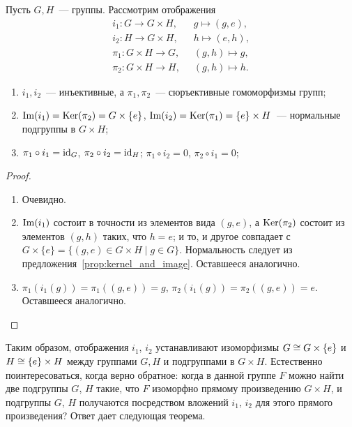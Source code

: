 \begin{proposition}\label{prop:direct_product_properties}
Пусть $G,H$~--- группы.
Рассмотрим отображения
\begin{align*}
i_1\colon G\to G\times H,&\;\; g\mapsto (g,e),\\
i_2\colon H\to G\times H,&\;\; h\mapsto (e,h),\\
\pi_1\colon G\times H\to G,&\;\; (g,h)\mapsto g,\\
\pi_2\colon G\times H\to H,&\;\; (g,h)\mapsto h.
\end{align*}
\begin{enumerate}
\item $i_1,i_2$~--- инъективные, а $\pi_1,\pi_2$~--- сюръективные
  гомоморфизмы групп;
\item\label{item:direct_product_2}
  $\operatorname{Im}(i_1)=\operatorname{Ker}(\pi_2)=G\times\{e\}$,
  $\operatorname{Im}(i_2)=\operatorname{Ker}(\pi_1)=\{e\}\times H$~--- нормальные подгруппы в
  $G\times H$;
\item $\pi_1\circ i_1 = \operatorname{id}_G$, $\pi_2\circ i_2 = \operatorname{id}_H$;
  $\pi_1\circ i_2 = 0$, $\pi_2\circ i_1 = 0$;
\end{enumerate}
\end{proposition}
\begin{proof}
\begin{enumerate}
\item Очевидно.
\item $\operatorname{Im}(i_1)$ состоит в точности из элементов вида $(g,e)$, а
  $\operatorname{Ker}(\pi_2)$ состоит из элементов $(g,h)$ таких, что $h=e$; и то, и
  другое совпадает с $G\times\{e\} = \{(g,e)\in G\times H\mid g\in
  G\}$. Нормальность следует из
  предложения~\ref{prop:kernel_and_image}. Оставшееся аналогично.
\item $\pi_1(i_1(g)) = \pi_1((g,e)) = g$, $\pi_2(i_1(g)) =
  \pi_2((g,e)) = e$. Оставшееся аналогично.
\end{enumerate}
\end{proof}

Таким образом, отображения $i_1$, $i_2$ устанавливают изоморфизмы
$G\cong G\times\{e\}$ и $H\cong \{e\}\times H$ между группами $G,H$ и
подгруппами в $G\times H$. Естественно поинтересоваться, когда верно
обратное: когда в данной группе $F$ можно найти две подгруппы $G$,
$H$ такие, что $F$ изоморфно прямому произведению $G\times H$, и
подгруппы $G$, $H$ получаются посредством вложений $i_1$, $i_2$ для
этого прямого произведения? Ответ дает следующая теорема.

